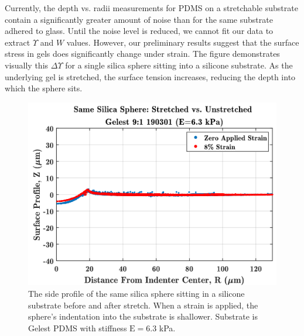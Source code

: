 Currently, the depth vs. radii measurements for PDMS on a stretchable substrate contain a significantly greater amount of noise than for the same substrate adhered to glass. Until the noise level is reduced, we cannot fit our data to extract $ \Upsilon $ and $ W $ values. However, our preliminary results suggest that the surface stress in gels does significantly change under strain. The figure demonstrates visually this $ \Delta\Upsilon $ for a single silica sphere sitting into a silicone substrate. As the underlying gel is stretched, the surface tension increases, reducing the depth into which the sphere sits. 
\begin{figure}[h!]
	\centering
	\includegraphics[width=\linewidth]{Chapters/Figures/stretch_v_unstretched_0-88-ST1_INTRO}
	\caption[Side Collapse Comparison]{The side profile of the same silica sphere sitting in a silicone substrate before and after stretch. When a strain is applied, the sphere's indentation into the substrate is shallower. Substrate is Gelest PDMS with stiffness $\text{E}=6.3$ kPa.}	
	\label{fig:sc1unstretchedv8ml}
\end{figure}

